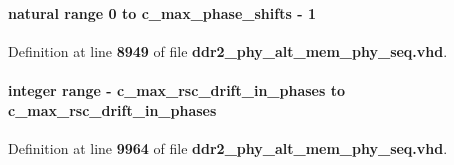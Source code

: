 \paragraph[{sig\+\_\+rsc\+\_\+curr\+\_\+phase}]{ {\bfseries \textcolor{comment}{natural}\textcolor{vhdlchar}{ }\textcolor{vhdlchar}{ }\textcolor{vhdlchar}{ }\textcolor{keywordflow}{range}\textcolor{vhdlchar}{ }\textcolor{vhdlchar}{ } \textcolor{vhdldigit}{0} \textcolor{vhdlchar}{ }\textcolor{keywordflow}{to}\textcolor{vhdlchar}{ }\textcolor{vhdlchar}{ }\textcolor{vhdlchar}{ }\textcolor{vhdlchar}{ }{\bfseries {\bf c\+\_\+max\+\_\+phase\+\_\+shifts}} \textcolor{vhdlchar}{-\/}\textcolor{vhdlchar}{ } \textcolor{vhdldigit}{1} \textcolor{vhdlchar}{ }} \hspace{0.3cm}{\ttfamily [Signal]}}\label{classddr2__phy__alt__mem__phy__dgrb_1_1struct_adf344fcbe1cda31f58773aff944c9adc}


Definition at line {\bf 8949} of file {\bf ddr2\+\_\+phy\+\_\+alt\+\_\+mem\+\_\+phy\+\_\+seq.\+vhd}.

\paragraph[{sig\+\_\+rsc\+\_\+drift}]{ {\bfseries \textcolor{comment}{integer}\textcolor{vhdlchar}{ }\textcolor{vhdlchar}{ }\textcolor{vhdlchar}{ }\textcolor{keywordflow}{range}\textcolor{vhdlchar}{ }\textcolor{vhdlchar}{-\/}\textcolor{vhdlchar}{ }\textcolor{vhdlchar}{ }\textcolor{vhdlchar}{ }{\bfseries {\bf c\+\_\+max\+\_\+rsc\+\_\+drift\+\_\+in\+\_\+phases}} \textcolor{vhdlchar}{ }\textcolor{keywordflow}{to}\textcolor{vhdlchar}{ }\textcolor{vhdlchar}{ }\textcolor{vhdlchar}{ }\textcolor{vhdlchar}{ }{\bfseries {\bf c\+\_\+max\+\_\+rsc\+\_\+drift\+\_\+in\+\_\+phases}} \textcolor{vhdlchar}{ }} \hspace{0.3cm}{\ttfamily [Signal]}}\label{classddr2__phy__alt__mem__phy__dgrb_1_1struct_accddcd0361e6f156e3d1210422053862}


Definition at line {\bf 9964} of file {\bf ddr2\+\_\+phy\+\_\+alt\+\_\+mem\+\_\+phy\+\_\+seq.\+vhd}.

